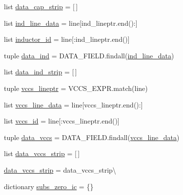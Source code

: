 \begin{DoxyCompactItemize}
list \hyperlink{classsage__circuit__analysis_1_1SmallSignalLinearCircuit_aacff1784dfd554fb7978d4f4ac173e17}{data\-\_\-cap\-\_\-strip} = \mbox{[}$\,$\mbox{]}
\item 
list \hyperlink{classsage__circuit__analysis_1_1SmallSignalLinearCircuit_ab6403cd28f6175b97ec548c76bada2c1}{ind\-\_\-line\-\_\-data} = line\mbox{[}ind\-\_\-lineptr.\-end()\-:\mbox{]}
\item 
list \hyperlink{classsage__circuit__analysis_1_1SmallSignalLinearCircuit_a76cb5cf53a673b999a9209557fe68d43}{inductor\-\_\-id} = line\mbox{[}\-:ind\-\_\-lineptr.\-end()\mbox{]}
\item 
tuple \hyperlink{classsage__circuit__analysis_1_1SmallSignalLinearCircuit_a0ab535620d613766af041f56e90dc25d}{data\-\_\-ind} = D\-A\-T\-A\-\_\-\-F\-I\-E\-L\-D.\-findall(\hyperlink{classsage__circuit__analysis_1_1SmallSignalLinearCircuit_ab6403cd28f6175b97ec548c76bada2c1}{ind\-\_\-line\-\_\-data})
\item 
list \hyperlink{classsage__circuit__analysis_1_1SmallSignalLinearCircuit_ab693d2fb55cdc265d81723077b2fb0b7}{data\-\_\-ind\-\_\-strip} = \mbox{[}$\,$\mbox{]}
\item 
tuple \hyperlink{classsage__circuit__analysis_1_1SmallSignalLinearCircuit_ad9e4262088a5c3f8c4a9192d8a4c87bc}{vccs\-\_\-lineptr} = V\-C\-C\-S\-\_\-\-E\-X\-P\-R.\-match(line)
\item 
list \hyperlink{classsage__circuit__analysis_1_1SmallSignalLinearCircuit_af5783933e230a77ac5f5c00a8f48670f}{vccs\-\_\-line\-\_\-data} = line\mbox{[}vccs\-\_\-lineptr.\-end()\-:\mbox{]}
\item 
list \hyperlink{classsage__circuit__analysis_1_1SmallSignalLinearCircuit_a4a91a18a481b2b820786b4a898b20a05}{vccs\-\_\-id} = line\mbox{[}\-:vccs\-\_\-lineptr.\-end()\mbox{]}
\item 
tuple \hyperlink{classsage__circuit__analysis_1_1SmallSignalLinearCircuit_a9513ea4a394dd0823a536eb8bcd79a68}{data\-\_\-vccs} = D\-A\-T\-A\-\_\-\-F\-I\-E\-L\-D.\-findall(\hyperlink{classsage__circuit__analysis_1_1SmallSignalLinearCircuit_af5783933e230a77ac5f5c00a8f48670f}{vccs\-\_\-line\-\_\-data})
\item 
list \hyperlink{classsage__circuit__analysis_1_1SmallSignalLinearCircuit_aa226f92e04b7403d7dc855fa76037661}{data\-\_\-vccs\-\_\-strip} = \mbox{[}$\,$\mbox{]}
\item 
\hyperlink{classsage__circuit__analysis_1_1SmallSignalLinearCircuit_aa2e5ba22e9018f37678c41afcc46f540}{data\-\_\-vccs\-\_\-strip} = data\-\_\-vccs\-\_\-strip\textbackslash{}
\item 
dictionary \hyperlink{classsage__circuit__analysis_1_1SmallSignalLinearCircuit_a426f0a105f7ef0a01f4d28ff20b4ff03}{subs\-\_\-zero\-\_\-ic} = \{\}
\end{DoxyCompactItemize}


